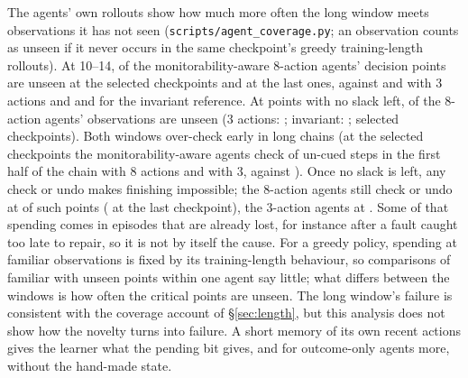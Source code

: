 The agents' own rollouts show how much more often the long window meets observations it has not seen (\texttt{scripts/agent\_coverage.py}; an observation counts as unseen if it never occurs in the same checkpoint's greedy training-length rollouts). At 10--14,  of the monitorability-aware 8-action agents' decision points are unseen at the selected checkpoints and  at the last ones, against  and  with 3 actions and  and  for the invariant reference. At points with no slack left,  of the 8-action agents' observations are unseen (3 actions: ; invariant: ; selected checkpoints). Both windows over-check early in long chains (at the selected checkpoints the monitorability-aware agents check  of un-cued steps in the first half of the chain with 8 actions and  with 3, against ). Once no slack is left, any check or undo makes finishing impossible; the 8-action agents still check or undo at  of such points ( at the last checkpoint), the 3-action agents at . Some of that spending comes in episodes that are already lost, for instance after a fault caught too late to repair, so it is not by itself the cause. For a greedy policy, spending at familiar observations is fixed by its training-length behaviour, so comparisons of familiar with unseen points within one agent say little; what differs between the windows is how often the critical points are unseen. The long window's failure is consistent with the coverage account of \S\ref{sec:length}, but this analysis does not show how the novelty turns into failure. A short memory of its own recent actions gives the learner what the pending bit gives, and for outcome-only agents more, without the hand-made state.

